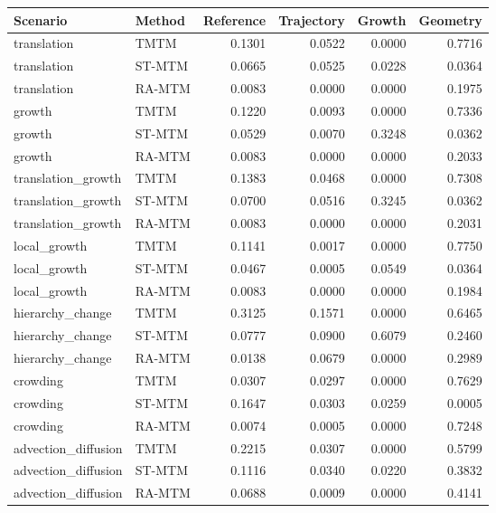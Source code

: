 \begin{tabular}{llrrrr}
Scenario & Method & Reference & Trajectory & Growth & Geometry \\
\hline
translation & TMTM & 0.1301 & 0.0522 & 0.0000 & 0.7716 \\
translation & ST-MTM & 0.0665 & 0.0525 & 0.0228 & 0.0364 \\
translation & RA-MTM & 0.0083 & 0.0000 & 0.0000 & 0.1975 \\
growth & TMTM & 0.1220 & 0.0093 & 0.0000 & 0.7336 \\
growth & ST-MTM & 0.0529 & 0.0070 & 0.3248 & 0.0362 \\
growth & RA-MTM & 0.0083 & 0.0000 & 0.0000 & 0.2033 \\
translation\_growth & TMTM & 0.1383 & 0.0468 & 0.0000 & 0.7308 \\
translation\_growth & ST-MTM & 0.0700 & 0.0516 & 0.3245 & 0.0362 \\
translation\_growth & RA-MTM & 0.0083 & 0.0000 & 0.0000 & 0.2031 \\
local\_growth & TMTM & 0.1141 & 0.0017 & 0.0000 & 0.7750 \\
local\_growth & ST-MTM & 0.0467 & 0.0005 & 0.0549 & 0.0364 \\
local\_growth & RA-MTM & 0.0083 & 0.0000 & 0.0000 & 0.1984 \\
hierarchy\_change & TMTM & 0.3125 & 0.1571 & 0.0000 & 0.6465 \\
hierarchy\_change & ST-MTM & 0.0777 & 0.0900 & 0.6079 & 0.2460 \\
hierarchy\_change & RA-MTM & 0.0138 & 0.0679 & 0.0000 & 0.2989 \\
crowding & TMTM & 0.0307 & 0.0297 & 0.0000 & 0.7629 \\
crowding & ST-MTM & 0.1647 & 0.0303 & 0.0259 & 0.0005 \\
crowding & RA-MTM & 0.0074 & 0.0005 & 0.0000 & 0.7248 \\
advection\_diffusion & TMTM & 0.2215 & 0.0307 & 0.0000 & 0.5799 \\
advection\_diffusion & ST-MTM & 0.1116 & 0.0340 & 0.0220 & 0.3832 \\
advection\_diffusion & RA-MTM & 0.0688 & 0.0009 & 0.0000 & 0.4141 \\
\end{tabular}
